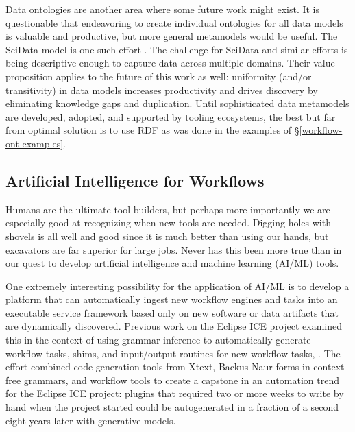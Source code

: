 Data ontologies are another area where some future work might exist. It is
questionable that endeavoring to create individual ontologies for all data
models is valuable and productive, but more general metamodels would be useful.
The SciData model is one such effort \cite{noauthor_scidata_nodate}. The
challenge for SciData and similar efforts is being descriptive enough to capture
data across multiple domains. Their value proposition applies to the future of
this work as well: uniformity (and/or transitivity) in data models increases
productivity and drives discovery by eliminating knowledge gaps and duplication.
Until sophisticated data metamodels are developed, adopted, and supported by
tooling ecosystems, the best but far from optimal solution is to use RDF as was
done in the examples of \S \ref{workflow-ont-examples}.

\subsection{Artificial Intelligence for Workflows}

Humans are the ultimate tool builders, but perhaps more importantly we are
especially good at recognizing when new tools are needed. Digging holes with
shovels is all well and good since it is much better than using our hands, but
excavators are far superior for large jobs. Never has this been more true than
in our quest to develop artificial intelligence and machine learning (AI/ML)
tools.

One extremely interesting possibility for the application of AI/ML is to develop
a platform that can automatically ingest new workflow engines and tasks into an
executable service framework based only on new software or data artifacts that
are dynamically discovered. Previous work on the Eclipse ICE project examined
this in the context of using grammar inference to automatically generate
workflow tasks, shims, and input/output routines for new workflow tasks,
\cite{bennett_rapid_2015}. The effort combined code generation tools from Xtext,
Backus-Naur forms in context free grammars, and workflow tools to create a
capstone in an automation trend for the Eclipse ICE project: plugins that
required two or more weeks to write by hand when the project started could be
autogenerated in a fraction of a second eight years later with generative
models.

